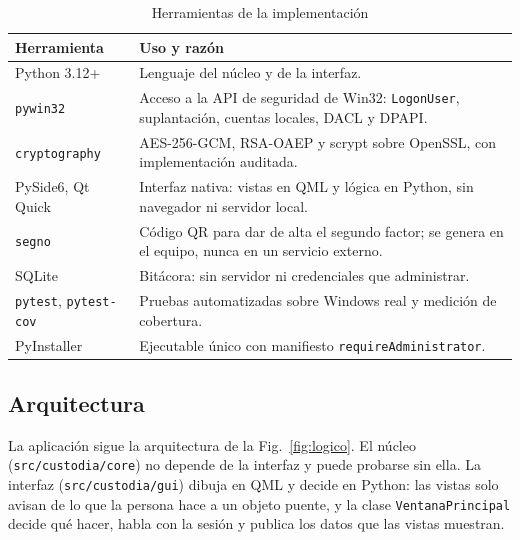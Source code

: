 \documentclass[conference]{IEEEtran}
\begin{document}
\begin{table}[!htb]
\caption{Herramientas de la implementación}
\label{tab:herramientas}
\centering
\footnotesize
\setlength{\tabcolsep}{3pt}
\begin{tabular}{|p{2.45cm}|p{5.45cm}|}
\hline
\textbf{Herramienta} & \textbf{Uso y razón} \\
\hline
Python 3.12+ & Lenguaje del núcleo y de la interfaz. \\
\hline
\texttt{pywin32}~\cite{pywin32} & Acceso a la API de seguridad de Win32: \texttt{LogonUser}, suplantación, cuentas locales, DACL y DPAPI. \\
\hline
\texttt{crypto\-graphy}~\cite{pyca} & AES-256-GCM, RSA-OAEP y scrypt sobre OpenSSL, con implementación auditada. \\
\hline
PySide6, Qt Quick~\cite{pyside} & Interfaz nativa: vistas en QML y lógica en Python, sin navegador ni servidor local. \\
\hline
\texttt{segno}~\cite{segno} & Código QR para dar de alta el segundo factor; se genera en el equipo, nunca en un servicio externo. \\
\hline
SQLite~\cite{sqlite} & Bitácora: sin servidor ni credenciales que administrar. \\
\hline
\texttt{pytest}, \texttt{pytest-cov}~\cite{pytestcov} & Pruebas automatizadas sobre Windows real y medición de cobertura. \\
\hline
PyInstaller~\cite{pyinstaller} & Ejecutable único con manifiesto \texttt{requireAdministrator}. \\
\hline
\end{tabular}
\end{table}

\subsection{Arquitectura}
La aplicación sigue la arquitectura de la Fig.~\ref{fig:logico}. El núcleo (\texttt{src/custodia/core}) no depende de la interfaz y puede probarse sin ella. La interfaz (\texttt{src/custodia/gui}) dibuja en QML y decide en Python: las vistas solo avisan de lo que la persona hace a un objeto puente, y la clase \texttt{VentanaPrincipal} decide qué hacer, habla con la sesión y publica los datos que las vistas muestran.
\end{document}
